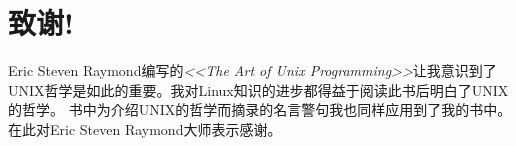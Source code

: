 \thispagestyle{empty}
\chapter*{致谢!}

Eric Steven Raymond编写的\textit{<<The Art of Unix Programming>>}让我意识到了UNIX哲学是如此的重要。我对Linux知识的进步都得益于阅读此书后明白了UNIX的哲学。
书中为介绍UNIX的哲学而摘录的名言警句我也同样应用到了我的书中。在此对Eric Steven Raymond大师表示感谢。

\newpage\thispagestyle{empty}